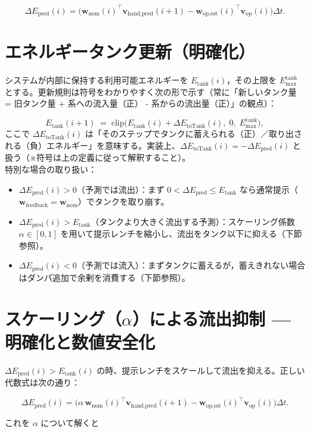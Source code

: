 \documentclass[a4paper,11pt]{article}
\begin{document}
\[
  \Delta E_{\text{pred}}(i) = \big( \bm{w}_{\text{nom}}(i)^\top \bm{v}_{\text{hand,pred}}(i+1) - \bm{w}_{\text{op,est}}(i)^\top \bm{v}_{\text{op}}(i) \big)\Delta t.
\]

\section{エネルギータンク更新（明確化）}
システムが内部に保持する利用可能エネルギーを $E_{\text{tank}}(i)$，その上限を $E_{\max}^{\text{tank}}$ とする。更新規則は符号をわかりやすく次の形で示す（常に「新しいタンク量 = 旧タンク量 + 系への流入量（正） - 系からの流出量（正）」の観点）：

\[
  E_{\text{tank}}(i+1) \;=\; \mathrm{clip}\big( E_{\text{tank}}(i) + \Delta E_{\text{toTank}}(i),\; 0,\; E_{\max}^{\text{tank}} \big),
\]
ここで $\Delta E_{\text{toTank}}(i)$ は「そのステップでタンクに蓄えられる（正）／取り出される（負）エネルギー」を意味する。実装上、\(\Delta E_{\text{toTank}}(i)= -\Delta E_{\text{pred}}(i)\) と扱う（※符号は上の定義に従って解釈すること）。\\

特別な場合の取り扱い：
\begin{itemize}
  \item $\Delta E_{\text{pred}}(i) > 0$（予測では流出）：まず $0 < \Delta E_{\text{pred}} \le E_{\text{tank}}$ なら通常提示（$ \bm{w}_{\text{feedback}} = \bm{w}_{\text{nom}}$）でタンクを取り崩す。
  \item $\Delta E_{\text{pred}}(i) > E_{\text{tank}}$（タンクより大きく流出する予測）：スケーリング係数 $\alpha\in[0,1]$ を用いて提示レンチを縮小し、流出をタンク以下に抑える（下節参照）。
  \item $\Delta E_{\text{pred}}(i) < 0$（予測では流入）：まずタンクに蓄えるが，蓄えきれない場合はダンパ追加で余剰を消費する（下節参照）。
\end{itemize}

\section{スケーリング（$\alpha$）による流出抑制 --- 明確化と数値安全化}
$\Delta E_{\text{pred}}(i) > E_{\text{tank}}(i)$ の時、提示レンチをスケールして流出を抑える。正しい代数式は次の通り：

\[
  \Delta E_{\text{pred}}(i) = \big( \alpha \,\bm{w}_{\text{nom}}(i)^\top \bm{v}_{\text{hand,pred}}(i+1) - \bm{w}_{\text{op,est}}(i)^\top \bm{v}_{\text{op}}(i) \big)\Delta t.
\]

これを $\alpha$ について解くと
\end{document}

